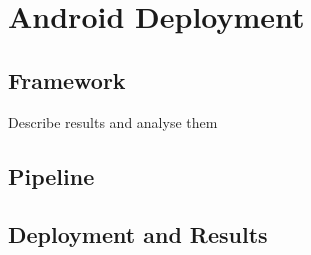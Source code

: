 

    \chapter{Android Deployment}
	\label{chap:androiddeploy}
	
    \section{Framework}

    Describe results and analyse them

    \section{Pipeline}

    \section{Deployment and Results}
    

